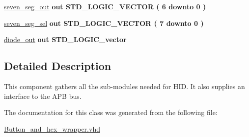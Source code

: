 \begin{DoxyCompactItemize}
\item 
\hypertarget{classbutton__and__hex__wrapper_a45655c10fcad02d37d83f5279ebb199b}{\hyperlink{classbutton__and__hex__wrapper_a45655c10fcad02d37d83f5279ebb199b}{seven\-\_\-seg\-\_\-out}  {\bfseries {\bfseries \textcolor{vhdlkeyword}{out}\textcolor{vhdlchar}{ }}} {\bfseries \textcolor{comment}{S\-T\-D\-\_\-\-L\-O\-G\-I\-C\-\_\-\-V\-E\-C\-T\-O\-R}\textcolor{vhdlchar}{ }\textcolor{vhdlchar}{(}\textcolor{vhdlchar}{ }\textcolor{vhdlchar}{ } \textcolor{vhdldigit}{6} \textcolor{vhdlchar}{ }\textcolor{vhdlchar}{ }\textcolor{vhdlchar}{ }\textcolor{vhdlkeyword}{downto}\textcolor{vhdlchar}{ }\textcolor{vhdlchar}{ }\textcolor{vhdlchar}{ } \textcolor{vhdldigit}{0} \textcolor{vhdlchar}{ }\textcolor{vhdlchar}{)}\textcolor{vhdlchar}{ }} }\label{classbutton__and__hex__wrapper_a45655c10fcad02d37d83f5279ebb199b}

\item 
\hypertarget{classbutton__and__hex__wrapper_ae1646bd2ce2b0e1d1bb85bf2a88d1b5f}{\hyperlink{classbutton__and__hex__wrapper_ae1646bd2ce2b0e1d1bb85bf2a88d1b5f}{seven\-\_\-seg\-\_\-sel}  {\bfseries {\bfseries \textcolor{vhdlkeyword}{out}\textcolor{vhdlchar}{ }}} {\bfseries \textcolor{comment}{S\-T\-D\-\_\-\-L\-O\-G\-I\-C\-\_\-\-V\-E\-C\-T\-O\-R}\textcolor{vhdlchar}{ }\textcolor{vhdlchar}{(}\textcolor{vhdlchar}{ }\textcolor{vhdlchar}{ } \textcolor{vhdldigit}{7} \textcolor{vhdlchar}{ }\textcolor{vhdlchar}{ }\textcolor{vhdlchar}{ }\textcolor{vhdlkeyword}{downto}\textcolor{vhdlchar}{ }\textcolor{vhdlchar}{ }\textcolor{vhdlchar}{ } \textcolor{vhdldigit}{0} \textcolor{vhdlchar}{ }\textcolor{vhdlchar}{)}\textcolor{vhdlchar}{ }} }\label{classbutton__and__hex__wrapper_ae1646bd2ce2b0e1d1bb85bf2a88d1b5f}

\item 
\hypertarget{classbutton__and__hex__wrapper_abe22c2d332237c0f84af43e5e835747c}{\hyperlink{classbutton__and__hex__wrapper_abe22c2d332237c0f84af43e5e835747c}{diode\-\_\-out}  {\bfseries {\bfseries \textcolor{vhdlkeyword}{out}\textcolor{vhdlchar}{ }}} {\bfseries \textcolor{comment}{S\-T\-D\-\_\-\-L\-O\-G\-I\-C\-\_\-vector}\textcolor{vhdlchar}{ }} }\label{classbutton__and__hex__wrapper_abe22c2d332237c0f84af43e5e835747c}

\end{DoxyCompactItemize}


\subsection{Detailed Description}
This component gathers all the sub-\/modules needed for H\-I\-D. It also supplies an interface to the A\-P\-B bus. 

The documentation for this class was generated from the following file\-:\begin{DoxyCompactItemize}
\item 
\hyperlink{Button__and__hex__wrapper_8vhd}{Button\-\_\-and\-\_\-hex\-\_\-wrapper.\-vhd}\end{DoxyCompactItemize}
